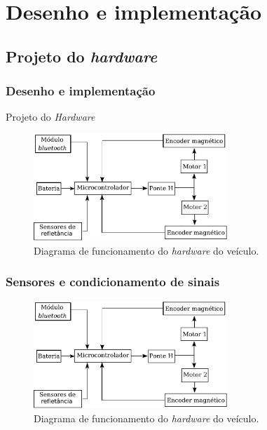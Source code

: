 \section{Desenho e implementação}

\subsection{Projeto do \textit{hardware}}

\begin{frame}
\frametitle{Desenho e implementação}

Projeto do \textit{Hardware}

\begin{figure}[th]
	\centering
	\captionsetup{width=0.65\textwidth,font=footnotesize,textfont=bf}
	\includegraphics[width=0.65\textwidth,keepaspectratio]{Figuras/DiagramaHW.pdf}
	\caption{Diagrama de funcionamento do \textit{hardware} do veículo.\label{fig:diagEl}}
\end{figure}

\end{frame}


\begin{frame}
\frametitle{Sensores e condicionamento de sinais}

\begin{figure}[th]
	\centering
	\captionsetup{width=0.65\textwidth,font=footnotesize,textfont=bf}
	\includegraphics[width=0.65\textwidth,keepaspectratio]{Figuras/DiagramaHW.pdf}
	\caption{Diagrama de funcionamento do \textit{hardware} do veículo.\label{fig:diagEl}}
\end{figure}


\end{frame}

